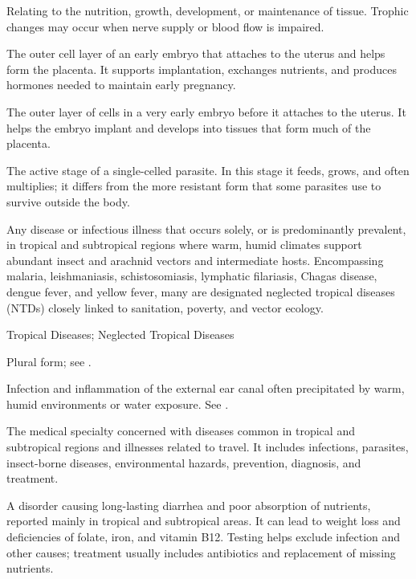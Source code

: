  Relating to the nutrition, growth, development, or maintenance of tissue. Trophic changes may occur when nerve supply or blood flow is impaired.

 The outer cell layer of an early embryo that attaches to the uterus and helps form the placenta. It supports implantation, exchanges nutrients, and produces hormones needed to maintain early pregnancy.

 The outer layer of cells in a very early embryo before it attaches to the uterus. It helps the embryo implant and develops into tissues that form much of the placenta.

 The active stage of a single-celled parasite. In this stage it feeds, grows, and often multiplies; it differs from the more resistant form that some parasites use to survive outside the body.

 Any disease or infectious illness that occurs solely, or is predominantly prevalent, in tropical and subtropical regions where warm, humid climates support abundant insect and arachnid vectors and intermediate hosts. Encompassing malaria, leishmaniasis, schistosomiasis, lymphatic filariasis, Chagas disease, dengue fever, and yellow fever, many are designated neglected tropical diseases (NTDs) closely linked to sanitation, poverty, and vector ecology.

\synonyms
Tropical Diseases; Neglected Tropical Diseases

 Plural form; see .

 Infection and inflammation of the external ear canal often precipitated by warm, humid environments or water exposure. See .

 The medical specialty concerned with diseases common in tropical and subtropical regions and illnesses related to travel. It includes infections, parasites, insect-borne diseases, environmental hazards, prevention, diagnosis, and treatment.

 A disorder causing long-lasting diarrhea and poor absorption of nutrients, reported mainly in tropical and subtropical areas. It can lead to weight loss and deficiencies of folate, iron, and vitamin B12. Testing helps exclude infection and other causes; treatment usually includes antibiotics and replacement of missing nutrients.

